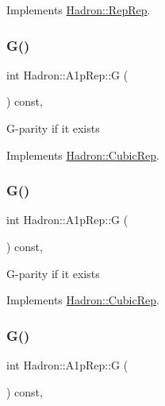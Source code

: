 Implements \mbox{\hyperlink{structHadron_1_1RepRep_a92c8802e5ed7afd7da43ccfd5b7cd92b}{Hadron\+::\+Rep\+Rep}}.

\mbox{\label{structHadron_1_1A1pRep_a4c6060ff01284b47d0ce71d5094b3e28}} 
\subsubsection{\texorpdfstring{G()}{G()}\hspace{0.1cm}{\footnotesize\ttfamily [1/3]}}
{\footnotesize\ttfamily int Hadron\+::\+A1p\+Rep\+::G (\begin{DoxyParamCaption}{ }\end{DoxyParamCaption}) const\hspace{0.3cm}{\ttfamily [inline]}, {\ttfamily [virtual]}}

G-\/parity if it exists 

Implements \mbox{\hyperlink{structHadron_1_1CubicRep_a52104e43266d1614c00bbd1c3b395458}{Hadron\+::\+Cubic\+Rep}}.

\mbox{\label{structHadron_1_1A1pRep_a4c6060ff01284b47d0ce71d5094b3e28}} 
\subsubsection{\texorpdfstring{G()}{G()}\hspace{0.1cm}{\footnotesize\ttfamily [2/3]}}
{\footnotesize\ttfamily int Hadron\+::\+A1p\+Rep\+::G (\begin{DoxyParamCaption}{ }\end{DoxyParamCaption}) const\hspace{0.3cm}{\ttfamily [inline]}, {\ttfamily [virtual]}}

G-\/parity if it exists 

Implements \mbox{\hyperlink{structHadron_1_1CubicRep_a52104e43266d1614c00bbd1c3b395458}{Hadron\+::\+Cubic\+Rep}}.

\mbox{\label{structHadron_1_1A1pRep_a4c6060ff01284b47d0ce71d5094b3e28}} 
\subsubsection{\texorpdfstring{G()}{G()}\hspace{0.1cm}{\footnotesize\ttfamily [3/3]}}
{\footnotesize\ttfamily int Hadron\+::\+A1p\+Rep\+::G (\begin{DoxyParamCaption}{ }\end{DoxyParamCaption}) const\hspace{0.3cm}{\ttfamily [inline]}, {\ttfamily [virtual]}}

